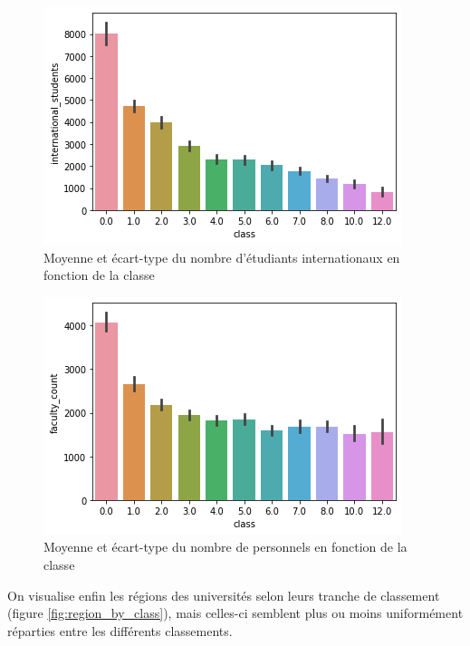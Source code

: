 \documentclass[twocolumns]{udes_rapport}
\begin{document}
    \begin{figure}[h!]
        \centering
        \includegraphics[scale=0.6]{Images/international_students_by_class.png}
        \caption{Moyenne et écart-type du nombre d'étudiants internationaux en fonction de la classe}
        \label{fig:international_students_by_class}
    \end{figure}
    
    \begin{figure}[h!]
        \centering
        \includegraphics[scale=0.6]{Images/faculty_count_by_class.png}
        \caption{Moyenne et écart-type du nombre de personnels en fonction de la classe}
        \label{fig:faculty_count_by_class}
    \end{figure}
    
    On visualise enfin les régions des universités selon leurs tranche de classement (figure \ref{fig:region_by_class}), mais celles-ci semblent plus ou moins uniformément réparties entre les différents classements.
    
\end{document}
